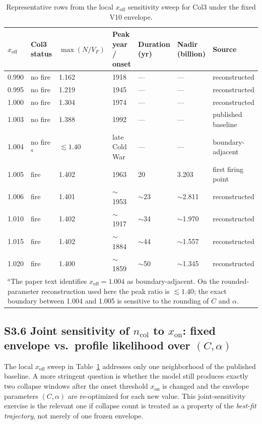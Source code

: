 \documentclass[11pt]{article}
\newcommand{\xon}{x_{\mathrm{on}}}
\newcommand{\xoff}{x_{\mathrm{off}}}
\begin{document}
\begin{table}[t]
\centering
\footnotesize
\caption{Representative rows from the local $x_{\mathrm{off}}$ sensitivity sweep for Col3 under the fixed V10 envelope.}
\label{tab:S3}
\begin{tabular}{lllllll}
\hline
$x_{\mathrm{off}}$ & Col3 status & $\max(N/V_F)$ & Peak year / onset & Duration (yr) & Nadir (billion) & Source \\
\hline
0.990 & no fire & 1.162 & 1918 & --- & --- & reconstructed \\
0.995 & no fire & 1.219 & 1945 & --- & --- & reconstructed \\
1.000 & no fire & 1.304 & 1974 & --- & --- & reconstructed \\
1.003 & no fire & 1.388 & 1992 & --- & --- & published baseline \\
1.004 & no fire$^{a}$ & $\lesssim 1.40$ & late Cold War & --- & --- & boundary-adjacent \\
1.005 & fire & 1.402 & 1963 & 20 & 3.203 & first firing point \\
1.006 & fire & 1.401 & $\sim$1953 & $\sim$23 & $\sim$2.811 & reconstructed \\
1.010 & fire & 1.402 & $\sim$1917 & $\sim$34 & $\sim$1.970 & reconstructed \\
1.015 & fire & 1.402 & $\sim$1884 & $\sim$44 & $\sim$1.557 & reconstructed \\
1.020 & fire & 1.400 & $\sim$1859 & $\sim$50 & $\sim$1.345 & reconstructed \\
\hline
\multicolumn{7}{p{0.93\linewidth}}{\footnotesize $^{a}$The paper text identifies $x_{\mathrm{off}}=1.004$ as boundary-adjacent. On the rounded-parameter reconstruction used here the peak ratio is $\lesssim 1.40$; the exact boundary between 1.004 and 1.005 is sensitive to the rounding of $C$ and $\alpha$.}\\
\end{tabular}
\end{table}

\subsection*{S3.6 Joint sensitivity of $n_{\mathrm{col}}$ to $x_{\mathrm{on}}$: fixed envelope vs.\ profile likelihood over $(C,\alpha)$}

The local $\xoff$ sweep in Table~\ref{tab:S3} addresses only one neighborhood of the published baseline. A more stringent question is whether the model still produces exactly two collapse windows after the onset threshold $\xon$ is changed and the envelope parameters $(C,\alpha)$ are re-optimized for each new value. This joint-sensitivity exercise is the relevant one if collapse count is treated as a property of the \emph{best-fit trajectory}, not merely of one frozen envelope.
\end{document}
